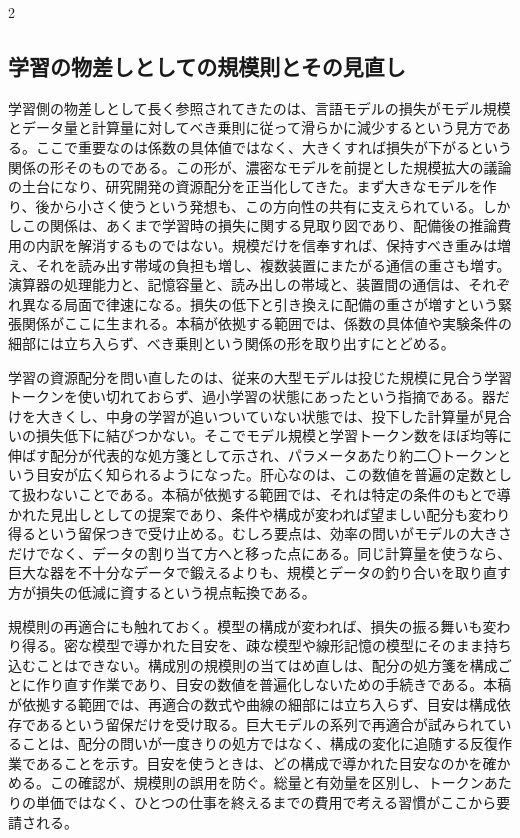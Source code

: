 \documentclass[lualatex,a4paper,10pt]{jlreq}
\begin{document}
\begin{multicols}{2}
\subsection{学習の物差しとしての規模則とその見直し}
学習側の物差しとして長く参照されてきたのは、言語モデルの損失がモデル規模とデータ量と計算量に対してべき乗則に従って滑らかに減少するという見方である\autocite{kaplan2020}。ここで重要なのは係数の具体値ではなく、大きくすれば損失が下がるという関係の形そのものである。この形が、濃密なモデルを前提とした規模拡大の議論の土台になり、研究開発の資源配分を正当化してきた。まず大きなモデルを作り、後から小さく使うという発想も、この方向性の共有に支えられている。しかしこの関係は、あくまで学習時の損失に関する見取り図であり、配備後の推論費用の内訳を解消するものではない。規模だけを信奉すれば、保持すべき重みは増え、それを読み出す帯域の負担も増し、複数装置にまたがる通信の重さも増す。演算器の処理能力と、記憶容量と、読み出しの帯域と、装置間の通信は、それぞれ異なる局面で律速になる。損失の低下と引き換えに配備の重さが増すという緊張関係がここに生まれる。本稿が依拠する範囲では、係数の具体値や実験条件の細部には立ち入らず、べき乗則という関係の形を取り出すにとどめる。

学習の資源配分を問い直したのは、従来の大型モデルは投じた規模に見合う学習トークンを使い切れておらず、過小学習の状態にあったという指摘である\autocite{chinchilla}。器だけを大きくし、中身の学習が追いついていない状態では、投下した計算量が見合いの損失低下に結びつかない。そこでモデル規模と学習トークン数をほぼ均等に伸ばす配分が代表的な処方箋として示され、パラメータあたり約二〇トークンという目安が広く知られるようになった。肝心なのは、この数値を普遍の定数として扱わないことである。本稿が依拠する範囲では、それは特定の条件のもとで導かれた見出しとしての提案であり、条件や構成が変われば望ましい配分も変わり得るという留保つきで受け止める。むしろ要点は、効率の問いがモデルの大きさだけでなく、データの割り当て方へと移った点にある。同じ計算量を使うなら、巨大な器を不十分なデータで鍛えるよりも、規模とデータの釣り合いを取り直す方が損失の低減に資するという視点転換である\autocite{chinchilla}。

規模則の再適合にも触れておく。模型の構成が変われば、損失の振る舞いも変わり得る。密な模型で導かれた目安を、疎な模型や線形記憶の模型にそのまま持ち込むことはできない。構成別の規模則の当てはめ直しは、配分の処方箋を構成ごとに作り直す作業であり、目安の数値を普遍化しないための手続きである。本稿が依拠する範囲では、再適合の数式や曲線の細部には立ち入らず、目安は構成依存であるという留保だけを受け取る。巨大モデルの系列で再適合が試みられていることは、配分の問いが一度きりの処方ではなく、構成の変化に追随する反復作業であることを示す。目安を使うときは、どの構成で導かれた目安なのかを確かめる。この確認が、規模則の誤用を防ぐ。総量と有効量を区別し、トークンあたりの単価ではなく、ひとつの仕事を終えるまでの費用で考える習慣がここから要請される。


\end{multicols}
\end{document}
